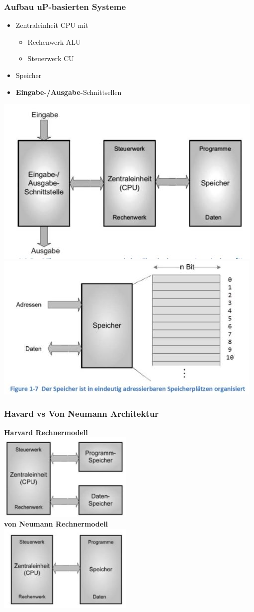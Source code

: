 \subsubsection{Aufbau uP-basierten Systeme}
\begin{itemize}
    \item Zentraleinheit CPU mit
    \begin{itemize}
        \item Rechenwerk ALU
        \item Steuerwerk CU
    \end{itemize}
    \item Speicher
    \item \textbf{Eingabe-/Ausgabe-}Schnittsellen
\end{itemize}
\includegraphics[width=0.5\linewidth]{images/aufbauuC1}
\includegraphics[width=0.5\linewidth]{images/aufbauuCspeicher}

\subsubsection{Havard vs Von Neumann Architektur}
\begin{multicols}{2}
    \textbf{Harvard Rechnermodell}\\
    \includegraphics[width=6.5cm]{images/HavardArchi}
    \\	
    \textbf{von Neumann Rechnermodell}\\
    \includegraphics[width=6.5cm]{images/NeumannArchi}
\end{multicols}
\clearpage

